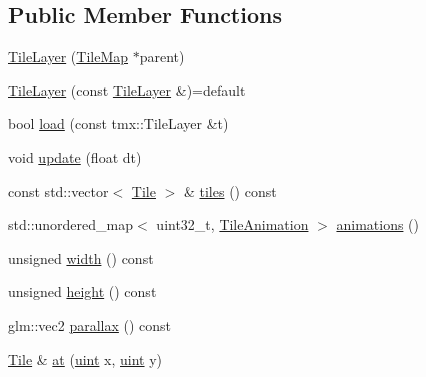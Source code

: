 \subsection*{Public Member Functions}
\begin{DoxyCompactItemize}
\item 
\hyperlink{classpixel_1_1_tile_layer_af2c7a21a841b0d7c079844953f82e983}{Tile\+Layer} (\hyperlink{classpixel_1_1_tile_map}{Tile\+Map} $\ast$parent)
\item 
\hyperlink{classpixel_1_1_tile_layer_ab9db42e7f9328be9d02383a47723bd4c}{Tile\+Layer} (const \hyperlink{classpixel_1_1_tile_layer}{Tile\+Layer} \&)=default
\item 
bool \hyperlink{classpixel_1_1_tile_layer_a46c041e1520a373e5f40433fdf4bbbb3}{load} (const tmx\+::\+Tile\+Layer \&t)
\item 
void \hyperlink{classpixel_1_1_tile_layer_ab238fb2c10840f8d4ff549a586426d6b}{update} (float dt)
\item 
const std\+::vector$<$ \hyperlink{structpixel_1_1_tile_layer_1_1_tile}{Tile} $>$ \& \hyperlink{classpixel_1_1_tile_layer_a7e26612b03d22048540c4a117761dcc3}{tiles} () const
\item 
std\+::unordered\+\_\+map$<$ uint32\+\_\+t, \hyperlink{classpixel_1_1_tile_layer_1_1_tile_animation}{Tile\+Animation} $>$ \hyperlink{classpixel_1_1_tile_layer_a40c1016a17820376f26bca1d716db9ba}{animations} ()
\item 
unsigned \hyperlink{classpixel_1_1_tile_layer_ab001179cccf44cc4c92f47d32e5851b1}{width} () const
\item 
unsigned \hyperlink{classpixel_1_1_tile_layer_a97798e165a5ba01f5a2bf543e683ac34}{height} () const
\item 
glm\+::vec2 \hyperlink{classpixel_1_1_tile_layer_a5c1a71e3c62f7b9b0696165475b2e3f2}{parallax} () const
\item 
\hyperlink{structpixel_1_1_tile_layer_1_1_tile}{Tile} \& \hyperlink{classpixel_1_1_tile_layer_a290919b189e12f179cbbda6b0609ce60}{at} (\hyperlink{namespacepixel_a6706355faabffaabebd430b2fa55843a}{uint} x, \hyperlink{namespacepixel_a6706355faabffaabebd430b2fa55843a}{uint} y)
\end{DoxyCompactItemize}
